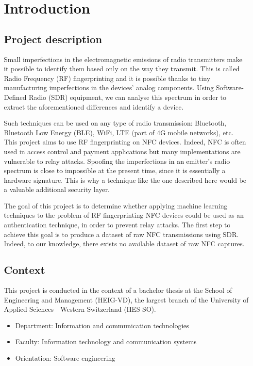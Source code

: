 \section{Introduction} \label{intro}

\subsection{Project description}

Small imperfections in the electromagnetic emissions of radio transmitters make it possible to identify them based only on the way they transmit. This is called Radio Frequency (RF) fingerprinting and it is possible thanks to tiny manufacturing imperfections in the devices' analog components. Using Software-Defined Radio (SDR) equipment, we can analyse this spectrum in order to extract the aforementioned differences and identify a device.

Such techniques can be used on any type of radio transmission: Bluetooth, Bluetooth Low Energy (BLE), WiFi, LTE (part of 4G mobile networks), etc. This project aims to use RF fingerprinting on NFC devices. Indeed, NFC is often used in access control and payment applications but many implementations are vulnerable to relay attacks. Spoofing the imperfections in an emitter's radio spectrum is close to impossible at the present time, since it is essentially a hardware signature. This is why a technique like the one described here would be a valuable additional security layer.

The goal of this project is to determine whether applying machine learning techniques to the problem of RF fingerprinting NFC devices could be used as an authentication technique, in order to prevent relay attacks. The first step to achieve this goal is to produce a dataset of raw NFC transmissions using SDR. Indeed, to our knowledge, there exists no available dataset of raw NFC captures.

\subsection{Context}

This project is conducted in the context of a bachelor thesis at the School of Engineering and Management (HEIG-VD), the largest branch of the University of Applied Sciences - Western Switzerland (HES-SO).

\begin{itemize}
  \item Department: Information and communication technologies
  \item Faculty: Information technology and communication systems
  \item Orientation: Software engineering
\end{itemize}

